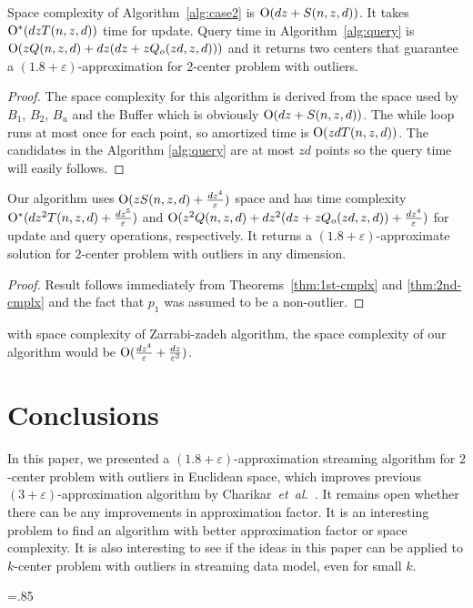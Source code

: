 \documentclass[envcountsame]{cls/cccg15}
\newcommand{\cO}{\ensuremath{{\rm O}}}
\newcommand{\lee}{\leqslant}
\renewcommand{\le}{\lee}
\newcommand{\eps}{\varepsilon}
\newcommand{\etal}{{\em et~al.\/}}
\begin{document}
\begin{theorem}
\label{thm:2nd-cmplx}
Space complexity of Algorithm~\ref{alg:case2} is $\cO(dz+S(n,z,d))$. It takes $\cO^*(dzT(n,z,d))$ time for update. Query time in Algorithm~\ref{alg:query} is $\cO(zQ(n,z,d) + dz(dz+zQ_o(zd,z,d)))$ and it returns two centers that guarantee a $(1.8 + \eps)$-approximation for $2$-center problem with outliers.
\end{theorem}

\begin{proof}
The space complexity for this algorithm is derived from the space used by $B_1$, $B_2$, $B_u$ and the Buffer which is obviously $\cO(dz+S(n,z,d))$. The while loop runs at most once for each point, so amortized time is $\cO(zdT(n,z,d))$. The candidates in the Algorithm \ref{alg:query} are at most $zd$ points  so the query time will easily follows.
\end{proof}

\begin{theorem}
Our algorithm uses $\cO(zS(n, z, d) + \frac{dz^4}{\eps})$ space and has time complexity $\cO^*(dz^2T(n,z,d) + \frac{dz^5}{\eps})$ and $\cO(z^2Q(n,z,d) + dz^2(dz+zQ_o(zd,z,d)) + \frac{dz^4}{\eps})$ for update and query operations, respectively. It returns a $(1.8 + \eps)$-approximate solution for $2$-center problem with outliers in any dimension.
\end{theorem}
\begin{proof}
Result follows immediately from Theorems~\ref{thm:1st-cmplx} and \ref{thm:2nd-cmplx} and the fact that $p_1$ was assumed to be a non-outlier.
\end{proof}

with space complexity of Zarrabi-zadeh \cite{zarrabi2009streaming} algorithm, the space complexity of our algorithm would be $\cO(\frac{dz^4}{\eps} + \frac{dz}{\eps^3})$.


\section{Conclusions}
\label{sec:conc}

In this paper, we presented a $(1.8 + \eps)$-approximation streaming algorithm for $2$-center problem with outliers in Euclidean space, which improves previous $(3+\eps)$-approximation algorithm by Charikar~\etal~\cite{mccutchen2008streaming}. It remains open whether there can be any improvements in approximation factor. It is an interesting problem to find an algorithm with better approximation factor or space complexity. It is also interesting to see if the ideas in this paper can be applied to $k$-center problem with outliers in streaming data model, even for small $k$.


\small
\baselineskip=.85\baselineskip


\end{document}
